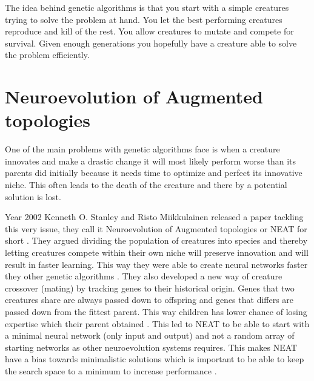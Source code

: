 \documentclass{kththesis}
\begin{document}
The idea behind genetic algorithms is that you start with a simple creatures trying to solve the problem at hand. You let the best performing creatures reproduce and kill of the rest. You allow creatures to mutate and compete for survival. Given enough generations you hopefully have a creature able to solve the problem efficiently.


\section{Neuroevolution of Augmented topologies}
One of the main problems with genetic algorithms face is when a creature innovates and make a drastic change it will most likely perform worse than its parents did initially because it needs time to optimize and perfect its innovative niche. This often leads to the death of the creature and there by a potential solution is lost.

Year 2002 Kenneth O. Stanley and Risto Miikkulainen released a paper tackling this very issue, they call it Neuroevolution of Augmented topologies or NEAT for short \parencite{NEAT}. They argued dividing the population of creatures into species and thereby letting creatures compete within their own niche will preserve innovation and will result in faster learning. This way they were able to create neural networks faster they other genetic algorithms \parencite{NEAT115}. They also developed a new way of creature crossover (mating) by tracking genes to their historical origin. Genes that two creatures share are always passed down to offspring and genes that differs are passed down from the fittest parent. This way children has lower chance of losing expertise which their parent obtained \parencite{NEAT108}. This led to NEAT to be able to start with a minimal neural network (only input and output) and not a random array of starting networks as other neuroevolution systems requires. This makes NEAT have a bias towards minimalistic solutions which is important to be able to keep the search space to a minimum to increase performance \parencite{NEAT111}.
\end{document}
